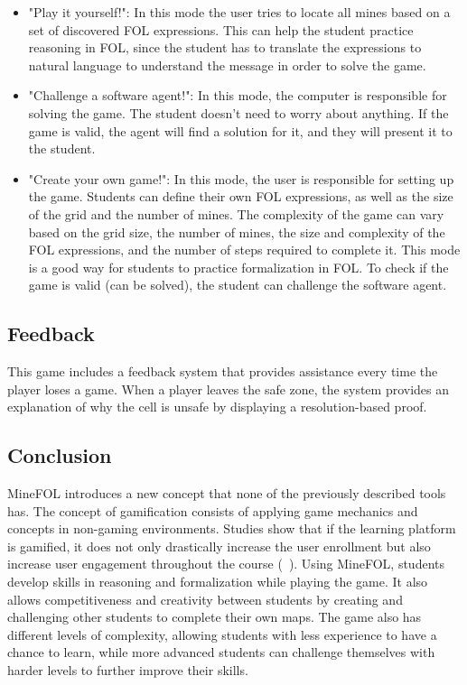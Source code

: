 \begin{itemize}
    \item "Play it yourself!": In this mode the user tries to locate all mines based on a set of discovered \gls{FOL} expressions. This can help the student practice reasoning in \gls{FOL}, since the student has to translate the expressions to natural language to understand the message in order to solve the game.
    \item "Challenge a software agent!": In this mode, the computer is responsible for solving the game. The student doesn't need to worry about anything. If the game is valid, the agent will find a solution for it, and they will present it to the student.
    \item "Create your own game!": In this mode, the user is responsible for setting up the game. Students can define their own \gls{FOL} expressions, as well as the size of the grid and the number of mines. The complexity of the game can vary based on the grid size, the number of mines, the size and complexity of the \gls{FOL} expressions, and the number of steps required to complete it. This mode is a good way for students to practice formalization in \gls{FOL}. To check if the game is valid (can be solved), the student can challenge the software agent.
\end{itemize}

\subsection{Feedback}
This game includes a feedback system that provides assistance every time the player loses a game. When a player leaves the safe zone, the system provides an explanation of why the cell is unsafe by displaying a resolution-based proof.

\subsection{Conclusion}
MineFOL introduces a new concept that none of the previously described tools has. The concept of gamification consists of applying game mechanics and concepts in non-gaming environments. Studies show that if the learning platform is gamified, it does not only drastically increase the user enrollment but also increase user engagement throughout the course (~\cite{vaibhav_gamification}). Using MineFOL, students develop skills in reasoning and formalization while playing the game. It also allows competitiveness and creativity between students by creating and challenging other students to complete their own maps. The game also has different levels of complexity, allowing students with less experience to have a chance to learn, while more advanced students can challenge themselves with harder levels to further improve their skills.


